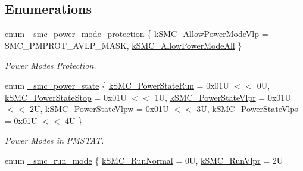\subsection*{Enumerations}
\begin{DoxyCompactItemize}
\item 
enum \mbox{\hyperlink{group__smc_ga53fe305f7c8245eb9faac439fc4d5051}{\+\_\+smc\+\_\+power\+\_\+mode\+\_\+protection}} \{ \mbox{\hyperlink{group__smc_gga53fe305f7c8245eb9faac439fc4d5051a59c7889c43c88969558086058a70025c}{k\+S\+M\+C\+\_\+\+Allow\+Power\+Mode\+Vlp}} = S\+M\+C\+\_\+\+P\+M\+P\+R\+O\+T\+\_\+\+A\+V\+L\+P\+\_\+\+M\+A\+SK, 
\mbox{\hyperlink{group__smc_gga53fe305f7c8245eb9faac439fc4d5051a2d2790f7f2a43e4fc6f3816cc1693328}{k\+S\+M\+C\+\_\+\+Allow\+Power\+Mode\+All}}
 \}
\begin{DoxyCompactList}\small\item\em Power Modes Protection. \end{DoxyCompactList}\item 
enum \mbox{\hyperlink{group__smc_gac5330d1b90932ef578e4e0d06b2f5ae5}{\+\_\+smc\+\_\+power\+\_\+state}} \{ \newline
\mbox{\hyperlink{group__smc_ggac5330d1b90932ef578e4e0d06b2f5ae5a5b88bef81d70c5bd0d36b4dfbe48c1e5}{k\+S\+M\+C\+\_\+\+Power\+State\+Run}} = 0x01U $<$$<$ 0U, 
\mbox{\hyperlink{group__smc_ggac5330d1b90932ef578e4e0d06b2f5ae5a4dfa7ded19a0d9fa1f56e7368cd70957}{k\+S\+M\+C\+\_\+\+Power\+State\+Stop}} = 0x01U $<$$<$ 1U, 
\mbox{\hyperlink{group__smc_ggac5330d1b90932ef578e4e0d06b2f5ae5a2457fcbd1884818e017070eca5f0233c}{k\+S\+M\+C\+\_\+\+Power\+State\+Vlpr}} = 0x01U $<$$<$ 2U, 
\mbox{\hyperlink{group__smc_ggac5330d1b90932ef578e4e0d06b2f5ae5a5fdb09565e37e164c4aacd389f3e7d87}{k\+S\+M\+C\+\_\+\+Power\+State\+Vlpw}} = 0x01U $<$$<$ 3U, 
\newline
\mbox{\hyperlink{group__smc_ggac5330d1b90932ef578e4e0d06b2f5ae5a6cb2be291b02b91744f137b71ebeabd6}{k\+S\+M\+C\+\_\+\+Power\+State\+Vlps}} = 0x01U $<$$<$ 4U
 \}
\begin{DoxyCompactList}\small\item\em Power Modes in P\+M\+S\+T\+AT. \end{DoxyCompactList}\item 
enum \mbox{\hyperlink{group__smc_gac2c182287ebbb6119d8bcbb6ead71e53}{\+\_\+smc\+\_\+run\+\_\+mode}} \{ \mbox{\hyperlink{group__smc_ggac2c182287ebbb6119d8bcbb6ead71e53abaeb1d66b5ab95289522985e831186de}{k\+S\+M\+C\+\_\+\+Run\+Normal}} = 0U, 
\mbox{\hyperlink{group__smc_ggac2c182287ebbb6119d8bcbb6ead71e53ac1461903d002daab1af773d6d506fea3}{k\+S\+M\+C\+\_\+\+Run\+Vlpr}} = 2U
$$
\end{DoxyCompactItemize}
